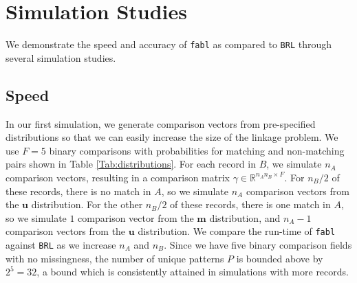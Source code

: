 \documentclass[ba]{imsart}
\begin{document}


	\section{Simulation Studies}
	\label{sec:simulations}
	
	We demonstrate the speed and accuracy of \texttt{fabl} as compared to \texttt{BRL} through several simulation studies. 
	
	\hypertarget{speed}{%
		\subsection{Speed}\label{speed}}
	
	In our first simulation, we generate comparison vectors from pre-specified distributions so that we can easily increase the size of the linkage problem. We use $F = 5$ binary comparisons with probabilities for matching and non-matching pairs shown in Table \ref{Tab:distributions}. For each record in $B$, we simulate $n_A$ comparison vectors, resulting in a comparison matrix $\gamma \in \mathbb{R}^{n_A n_B \times F}$. For $n_B/2$ of these records, there is no match in $A$, so we simulate $n_A$ comparison vectors from the $\bm{u}$ distribution. For the other $n_B/2$ of these records, there is one match in $A$, so we simulate $1$ comparison vector from the $\bm{m}$ distribution, and $n_A - 1$ comparison vectors from the $\bm{u}$ distribution. We compare the run-time of \texttt{fabl} against \texttt{BRL} as we increase $n_A$ and $n_B$. Since we have five binary comparison fields with no missingness, the number of unique patterns $P$ is bounded above by $2^5 = 32$, a bound which is consistently attained in simulations with more records.
	
	
\end{document}
